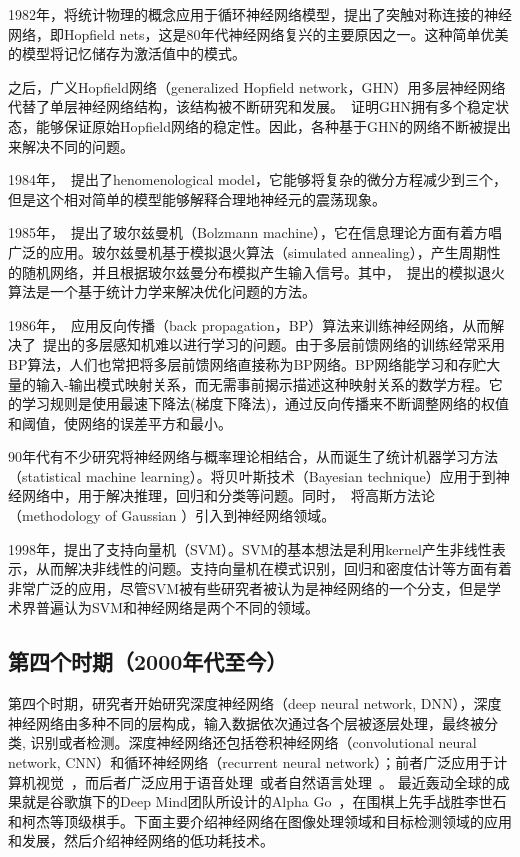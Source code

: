 1982年，\citet{hopfield1982neural}将统计物理的概念应用于循环神经网络模型，提出了突触对称连接的神经网络，即Hopfield nets，这是80年代神经网络复兴的主要原因之一。这种简单优美的模型将记忆储存为激活值中的模式。

之后，广义Hopfield网络（generalized Hopfield network，GHN）用多层神经网络代替了单层神经网络结构，该结构被不断研究和发展。~\citet{zurada1996generalized}证明GHN拥有多个稳定状态，能够保证原始Hopfield网络的稳定性。因此，各种基于GHN的网络不断被提出来解决不同的问题。

1984年，~\citet{hindmarsh1984model}提出了henomenological model，它能够将复杂的微分方程减少到三个，但是这个相对简单的模型能够解释合理地神经元的震荡现象。

1985年，~\citet{ackley1985learning}提出了玻尔兹曼机（Bolzmann machine），它在信息理论方面有着方唱广泛的应用。玻尔兹曼机基于模拟退火算法（simulated annealing），产生周期性的随机网络，并且根据玻尔兹曼分布模拟产生输入信号。其中，~\citet{kirkpatrick1983optimization, vcerny1985thermodynamical}提出的模拟退火算法是一个基于统计力学来解决优化问题的方法。

1986年，~\citet{rumelhart1986learning}应用反向传播（back propagation，BP）算法来训练神经网络，从而解决了~\citet{minsky5paper}提出的多层感知机难以进行学习的问题。由于多层前馈网络的训练经常采用BP算法，人们也常把将多层前馈网络直接称为BP网络。BP网络能学习和存贮大量的输入-输出模式映射关系，而无需事前揭示描述这种映射关系的数学方程。它的学习规则是使用最速下降法(梯度下降法)，通过反向传播来不断调整网络的权值和阈值，使网络的误差平方和最小。

90年代有不少研究将神经网络与概率理论相结合，从而诞生了统计机器学习方法（statistical machine learning）。\citet{mackay1992practical, bishop1995neural}将贝叶斯技术（Bayesian technique）应用于到神经网络中，用于解决推理，回归和分类等问题。同时，~\citet{williams1996gaussian}将高斯方法论（methodology of Gaussian ）引入到神经网络领域。

1998年，\citet{vapnik1998statistical}提出了支持向量机（SVM）。SVM的基本想法是利用kernel产生非线性表示，从而解决非线性的问题。支持向量机在模式识别，回归和密度估计等方面有着非常广泛的应用，尽管SVM被有些研究者被认为是神经网络的一个分支，但是学术界普遍认为SVM和神经网络是两个不同的领域。


\subsection{第四个时期（2000年代至今）}

第四个时期，研究者开始研究深度神经网络（deep neural network, DNN），深度神经网络由多种不同的层构成，输入数据依次通过各个层被逐层处理，最终被分类, 识别或者检测。深度神经网络还包括卷积神经网络（convolutional neural network, CNN）和循环神经网络（recurrent neural network）；前者广泛应用于计算机视觉~\cite{krizhevsky2012imagenet,simonyan2014very, ren2015faster}，而后者广泛应用于语音处理~\cite{hinton2012deep, amodei2015deep, ze2013statistical}或者自然语言处理~\cite{conneau2016very}。
最近轰动全球的成果就是谷歌旗下的Deep Mind团队所设计的Alpha Go~\cite{moyer2016google}，在围棋上先手战胜李世石和柯杰等顶级棋手。下面主要介绍神经网络在图像处理领域和目标检测领域的应用和发展，然后介绍神经网络的低功耗技术。

